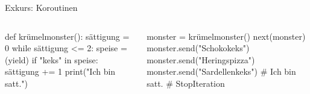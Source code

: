 \documentclass[xcolor=dvipsnames, aspectratio=169, 14pt]{beamer}
\begin{document}
\begin{frame}[fragile]{Exkurs: Koroutinen}
	\begin{columns}%
	\vspace{-\baselineskip}
	\begin{python3code}
	def krümelmonster():
		sättigung = 0
		while sättigung <= 2:
			speise = (yield)
			if "keks" in speise:
				sättigung += 1
		print("Ich bin satt.")
	\end{python3code}
	
	\vspace{-\baselineskip}
	\begin{python3code}
	monster = krümelmonster()
	next(monster)
	monster.send("Schokokeks")
	monster.send("Heringspizza")
	monster.send("Sardellenkeks")
	# Ich bin satt.
	# StopIteration
	\end{python3code}
	\end{columns}
\end{frame}
\end{document}
